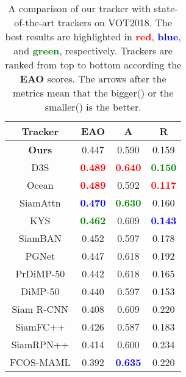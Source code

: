 \documentclass[final]{cvpr}
\begin{document}
\begin{table}[tbp]
 \centering
 \caption{\label{tab:vot2018_tab}A comparison of our tracker with state-of-the-art trackers on VOT2018. The best results are highlighted in \textcolor{red}{\textbf{red}}, \textcolor{blue}{\textbf{blue}}, and \textcolor{green}{\textbf{green}}, respectively. Trackers are ranked from top to bottom according the \textbf{EAO} scores. The arrows after the metrics mean that the bigger() or the smaller() is the better.}
 \vspace{-1.0em}
 \begin{tabular}{cccc}
  \toprule
  \textbf{Tracker} & \textbf{EAO} & \textbf{A} & \textbf{R} \\
  \midrule
  \textbf{Ours} & 0.447 & 0.590 & 0.159 \\
  D3S \cite{lukezic2020d3s} & \textcolor{red}{\textbf{0.489}} & \textcolor{red}{\textbf{0.640}} & \textcolor{green}{\textbf{0.150}} \\
  Ocean \cite{zhang2020ocean} & \textcolor{red}{\textbf{0.489}} & 0.592 & \textcolor{red}{\textbf{0.117}} \\
  SiamAttn \cite{yu2020deformable} & \textcolor{blue}{\textbf{0.470}} & \textcolor{green}{\textbf{0.630}} & 0.160 \\
  KYS \cite{bhat2020know} & \textcolor{green}{\textbf{0.462}} & 0.609 & \textcolor{blue}{\textbf{0.143}} \\
  SiamBAN \cite{chen2020siamese} & 0.452 & 0.597 & 0.178 \\
  PGNet \cite{liaopg} & 0.447 & 0.618 & 0.192 \\
  PrDiMP-50 \cite{danelljan2020probabilistic} & 0.442 & 0.618 & 0.165 \\
  DiMP-50 \cite{bhat2019learning} & 0.440 & 0.597 & 0.153 \\
  Siam R-CNN \cite{voigtlaender2020siam} & 0.408 & 0.609 & 0.220 \\
  SiamFC++ \cite{xu2020siamfc++} & 0.426 & 0.587 & 0.183 \\
  SiamRPN++ \cite{li2019siamrpn++} & 0.414 & 0.600 & 0.234 \\
  FCOS-MAML \cite{wang2020tracking} & 0.392 & \textcolor{blue}{\textbf{0.635}} & 0.220 \\
  \bottomrule
 \end{tabular}
 \vspace{-1.0em}
\end{table}
\end{document}
